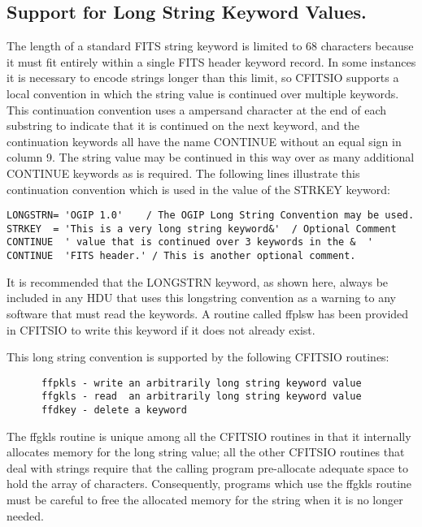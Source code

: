 \subsection{Support for Long String Keyword Values.}

The length of a standard FITS string keyword is limited to 68
characters because it must fit entirely within a single FITS header
keyword record.  In some instances it is necessary to encode strings
longer than this limit, so CFITSIO supports a local convention in which
the string value is continued over multiple keywords.  This
continuation convention uses a ampersand character at the end of each
substring to indicate that it is continued on the next keyword, and the
continuation keywords all have the name CONTINUE without an equal sign
in column 9. The string value may be continued in this way over as many
additional CONTINUE keywords as is required.  The following lines
illustrate this continuation convention which is used in the value of
the STRKEY keyword:

\begin{verbatim}
LONGSTRN= 'OGIP 1.0'    / The OGIP Long String Convention may be used.
STRKEY  = 'This is a very long string keyword&'  / Optional Comment
CONTINUE  ' value that is continued over 3 keywords in the &  '
CONTINUE  'FITS header.' / This is another optional comment.
\end{verbatim}
It is recommended that the LONGSTRN keyword, as shown here, always be
included in any HDU that uses this longstring convention as a warning
to any software that must read the keywords.  A routine called ffplsw
has been provided in CFITSIO to write this keyword if it does not
already exist.

This long string convention is supported by the following CFITSIO
routines:

\begin{verbatim}
      ffpkls - write an arbitrarily long string keyword value
      ffgkls - read  an arbitrarily long string keyword value
      ffdkey - delete a keyword
\end{verbatim}
The ffgkls routine is unique among all the CFITSIO routines in that it
internally allocates memory for the long string value;  all the other
CFITSIO routines that deal with strings require that the calling
program pre-allocate adequate space to hold the array of characters.
Consequently, programs which use the ffgkls routine must be careful to
free the allocated memory for the string when it is no longer needed.

